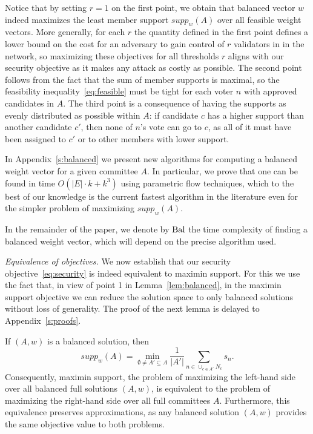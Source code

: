 Notice that by setting $r=1$ on the first point, we obtain that balanced vector $w$ indeed maximizes the least member support $supp_w(A)$ over all feasible weight vectors. 
More generally, for each $r$ the quantity defined in the first point defines a lower bound on the cost for an adversary to gain control of $r$ validators in in the network, so maximizing these objectives for all thresholds $r$ aligns with our security objective as it makes any attack as costly as possible. 
The second point follows from the fact that the sum of member supports is maximal, so the feasibility inequality~\eqref{eq:feasible} must be tight for each voter $n$ with approved candidates in $A$. The third point is a consequence of having the supports as evenly distributed as possible within $A$: if candidate $c$ has a higher support than another candidate $c'$, then none of $n$'s vote can go to $c$, as all of it must have been assigned to $c'$ or to other members with lower support. 

In Appendix~\ref{s:balanced} we present new algorithms for computing a balanced weight vector for a given committee $A$. 
In particular, we prove that one can be found in time $O(|E|\cdot k + k^3)$ using parametric flow techniques, which to the best of our knowledge is the current fastest algorithm in the literature even for the simpler problem of maximizing $supp_w(A)$.

\begin{remark}\label{rem:bal}
In the remainder of the paper, we denote by $\operatorname{Bal}$ the time complexity of finding a balanced weight vector, which will depend on the precise algorithm used.
\end{remark}

\emph{Equivalence of objectives.} 
We now establish that our security objective~\eqref{eq:security} is indeed equivalent to maximin support. 
For this we use the fact that, in view of point 1 in Lemma~\ref{lem:balanced}, in the maximin support objective we can reduce the solution space to only balanced solutions without loss of generality. The proof of the next lemma is delayed to Appendix~\ref{s:proofs}.

\begin{lemma} \label{lem:equivalence} If $(A,w)$ is a balanced solution, then
$$supp_w(A) = \min_{\emptyset\neq A' \subseteq A} \frac{1}{|A'|} \sum_{n\in \cup_{c\in A'} N_c} s_n.$$
Consequently, maximin support, the problem of maximizing the left-hand side over all balanced full solutions $(A,w)$, 
is equivalent to the problem of maximizing the right-hand side over all full committees $A$. 
Furthermore, this equivalence preserves approximations, as any balanced solution $(A,w)$ provides the same objective value to both problems.
\end{lemma}

